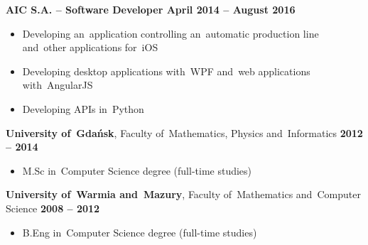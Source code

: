 \documentclass[11pt,a4paper]{article}
\newcommand*\header[1]{
    \noindent\raisebox{.1cm}{\color{MidnightBlue}\rule{1.5cm}{.1cm}\hspace{.2cm}\raisebox{-.1cm}{\large\bf #1}}}
\begin{document}
    \vspace{-.17cm}

    {\bf AIC S.A. -- Software Developer \hfill April 2014 -- August 2016}

    \vspace{-.23cm}
    \begin{itemize}[leftmargin=1.5cm] \itemsep.2mm \parskip0mm 
        \item Developing an~application controlling an~automatic production line and~other applications for~iOS
        \item Developing desktop applications with~WPF and~web applications with~AngularJS
        \item Developing APIs in~Python
    \end{itemize}


    \medskip
  
    \header{Education}
  
    \smallskip

    {{\bf University of~Gdańsk}, Faculty of~Mathematics, Physics and~Informatics \hfill {\bf 2012 -- 2014}}

    \vspace{-.23cm}
    \begin{itemize}[leftmargin=1.5cm] \itemsep.2mm \parskip0mm 
        \item[ ] M.Sc in~Computer Science degree (full-time studies)
    \end{itemize}

    \vspace{-.17cm}

    {{\bf University of~Warmia and~Mazury}, Faculty of~Mathematics and~Computer Science
        \hfill {\bf 2008 -- 2012}}

    \vspace{-.23cm}
    \begin{itemize}[leftmargin=1.5cm] \itemsep.2mm \parskip0mm 
        \item[ ] B.Eng in~Computer Science degree (full-time studies)
    \end{itemize}

    \vspace{-.17cm}
\end{document}
